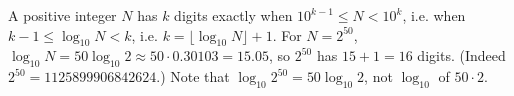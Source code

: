 A positive integer $N$ has $k$ digits exactly when $10^{k-1}\le N<10^k$, i.e. when $k-1\le\log_{10}N<k$, i.e. $k=\lfloor\log_{10}N\rfloor+1$. For $N=2^{50}$, $\log_{10}N=50\log_{10}2\approx50\cdot0.30103=15.05$, so $2^{50}$ has $15+1=\boxed{16}$ digits. (Indeed $2^{50}=1125899906842624$.) Note that $\log_{10}2^{50}=50\log_{10}2$, not $\log_{10}$ of $50\cdot2$.
